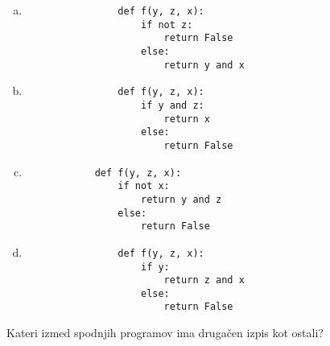 \documentclass[arhiv, 10pt]{../izpit}
\begin{document}
        \begin{multicols}{2}
        \begin{enumerate}[(a)]
\item 
                \begin{verbatim}
                def f(y, z, x):
                    if not z:
                        return False
                    else:
                        return y and x
                \end{verbatim}
            
\item 
                \begin{verbatim}
                def f(y, z, x):
                    if y and z:
                        return x
                    else:
                        return False
                \end{verbatim}
            
\item 
            \begin{verbatim}
            def f(y, z, x):
                if not x:
                    return y and z
                else:
                    return False
            \end{verbatim}
        
\item 
                \begin{verbatim}
                def f(y, z, x):
                    if y:
                        return z and x
                    else:
                        return False
                \end{verbatim}
            
\end{enumerate}

        \end{multicols}
    
        \naloga*
        
        Kateri izmed spodnjih programov ima drugačen izpis kot ostali?
    
\end{document}
